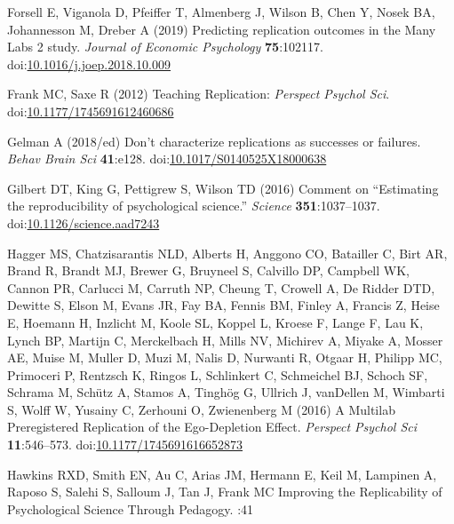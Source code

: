 \documentclass[
  english,
  a4paper,
]{article}
\newlength{\cslhangindent}
\newlength{\cslentryspacingunit} %
\newenvironment{CSLReferences}[2] %
 {%
  \setlength{\parindent}{0pt}
  \ifodd #1
  \let\oldpar\par
  \def\par{\hangindent=\cslhangindent\oldpar}
  \fi
  \setlength{\parskip}{#2\cslentryspacingunit}
 }%
 {}
\begin{document}
\begin{CSLReferences}{1}{0}
\leavevmode{}%
Forsell E, Viganola D, Pfeiffer T, Almenberg J, Wilson B, Chen Y, Nosek BA, Johannesson M, Dreber A (2019) Predicting replication outcomes in the {Many Labs} 2 study. \emph{Journal of Economic Psychology} \textbf{75}:102117. doi:\href{https://doi.org/10.1016/j.joep.2018.10.009}{10.1016/j.joep.2018.10.009}

\leavevmode{}%
Frank MC, Saxe R (2012) Teaching {Replication}: \emph{Perspect Psychol Sci}. doi:\href{https://doi.org/10.1177/1745691612460686}{10.1177/1745691612460686}

\leavevmode{}%
Gelman A (2018/ed) Don't characterize replications as successes or failures. \emph{Behav Brain Sci} \textbf{41}:e128. doi:\href{https://doi.org/10.1017/S0140525X18000638}{10.1017/S0140525X18000638}

\leavevmode{}%
Gilbert DT, King G, Pettigrew S, Wilson TD (2016) Comment on {``{Estimating} the reproducibility of psychological science.''} \emph{Science} \textbf{351}:1037--1037. doi:\href{https://doi.org/10.1126/science.aad7243}{10.1126/science.aad7243}

\leavevmode{}%
Hagger MS, Chatzisarantis NLD, Alberts H, Anggono CO, Batailler C, Birt AR, Brand R, Brandt MJ, Brewer G, Bruyneel S, Calvillo DP, Campbell WK, Cannon PR, Carlucci M, Carruth NP, Cheung T, Crowell A, De Ridder DTD, Dewitte S, Elson M, Evans JR, Fay BA, Fennis BM, Finley A, Francis Z, Heise E, Hoemann H, Inzlicht M, Koole SL, Koppel L, Kroese F, Lange F, Lau K, Lynch BP, Martijn C, Merckelbach H, Mills NV, Michirev A, Miyake A, Mosser AE, Muise M, Muller D, Muzi M, Nalis D, Nurwanti R, Otgaar H, Philipp MC, Primoceri P, Rentzsch K, Ringos L, Schlinkert C, Schmeichel BJ, Schoch SF, Schrama M, Schütz A, Stamos A, Tinghög G, Ullrich J, vanDellen M, Wimbarti S, Wolff W, Yusainy C, Zerhouni O, Zwienenberg M (2016) A {Multilab Preregistered Replication} of the {Ego-Depletion Effect}. \emph{Perspect Psychol Sci} \textbf{11}:546--573. doi:\href{https://doi.org/10.1177/1745691616652873}{10.1177/1745691616652873}

\leavevmode{}%
Hawkins RXD, Smith EN, Au C, Arias JM, Hermann E, Keil M, Lampinen A, Raposo S, Salehi S, Salloum J, Tan J, Frank MC Improving the {Replicability} of {Psychological Science Through Pedagogy}. :41


\end{CSLReferences}
\end{document}
